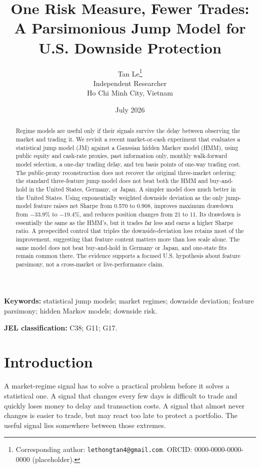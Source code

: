 \documentclass[11pt]{article}
\title{\textbf{One Risk Measure, Fewer Trades:}\\
A Parsimonious Jump Model for U.S. Downside Protection}
\author{}
\date{}
\author{Tan Le\thanks{Corresponding author: \texttt{lethongtan4@gmail.com}.
  ORCID: 0000-0000-0000-0000 (placeholder).}\\[2pt]
  \small Independent Researcher\\
  \small Ho Chi Minh City, Vietnam}
\date{July 2026}
\begin{document}
\maketitle

\begin{abstract}
Regime models are useful only if their signals survive the delay between
observing the market and trading it. We revisit a recent market-or-cash
experiment that evaluates a statistical jump model (JM) against a Gaussian
hidden Markov model (HMM), using public equity and cash-rate proxies, past
information only, monthly walk-forward model selection, a one-day trading delay,
and ten basis points of one-way trading cost. The public-proxy reconstruction
does not recover the original three-market ordering: the standard three-feature
jump model does not beat both the HMM and buy-and-hold in the United States,
Germany, or Japan. A simpler model does much better in the United States. Using
exponentially weighted downside deviation as the only jump-model feature raises
net Sharpe from 0.570 to 0.908, improves maximum drawdown from $-33.9\%$ to
$-19.4\%$, and reduces position changes from 21 to 11. Its drawdown is
essentially the same as the HMM's, but it trades far less and earns a higher
Sharpe ratio. A prespecified control that triples the downside-deviation loss
retains most of the improvement, suggesting that feature content matters more
than loss scale alone. The same model does not beat buy-and-hold in Germany or
Japan, and one-state fits remain common there. The evidence supports a focused
U.S. hypothesis about feature parsimony, not a cross-market or live-performance
claim.
\end{abstract}

\noindent\textbf{Keywords:} statistical jump models; market regimes; downside
deviation; feature parsimony; hidden Markov models; downside risk.

\bigskip
\noindent\textbf{JEL classification:} C38; G11; G17.

\section{Introduction}

A market-regime signal has to solve a practical problem before it solves a
statistical one. A signal that changes every few days is difficult to trade and
quickly loses money to delay and transaction costs. A signal that almost never
changes is easier to trade, but may react too late to protect a portfolio. The
useful signal lies somewhere between those extremes.
\end{document}

